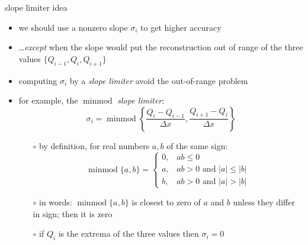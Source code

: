 \documentclass[10pt,dvipsnames,usepdftitle=false,
hyperref={pdftitle = {Finite volume methods},
    pdfauthor = {Ed Bueler}}]{beamer}
\newcommand{\minmod}{\operatorname{minmod}}
\begin{document}
\begin{frame}{slope limiter idea}

\begin{itemize}
\item we should use a nonzero slope $\sigma_i$ to get higher accuracy
\item \dots \emph{except} when the slope would put the reconstruction out of range of the three values $\{Q_{i-1},Q_i,Q_{i+1}\}$
\item computing $\sigma_i$ by a \emph{slope limiter} avoid the out-of-range problem
\item for example, the \alert{$\minmod$ \emph{slope limiter}:}
    $$\sigma_i = \minmod\left\{\frac{Q_i-Q_{i-1}}{\Delta x},\frac{Q_{i+1}-Q_i}{\Delta x}\right\}$$

    \begin{itemize}
    \item[$\circ$] by definition, for real numbers $a,b$ of the same sign:
        $$\minmod\{a,b\} = \begin{cases} 0, & ab \le 0 \\
                                         a, & ab>0 \text{ and } |a| \le |b| \\
                                         b, & ab>0 \text{ and } |a| > |b| \end{cases}$$
    \item[$\circ$] in words: $\minmod\{a,b\}$ is closest to zero of $a$ and $b$ unless they differ in sign; then it is zero
    \item[$\circ$] if $Q_i$ is the extrema of the three values then $\sigma_i = 0$
    \end{itemize}
\end{itemize}
\end{frame}
\end{document}
